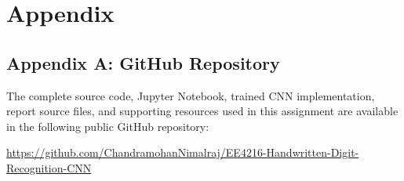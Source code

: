 \section{Appendix}
\subsection{Appendix A: GitHub Repository}

The complete source code, Jupyter Notebook, trained CNN implementation, report source files, and supporting resources used in this assignment are available in the following public GitHub repository:

\url{https://github.com/ChandramohanNimalraj/EE4216-Handwritten-Digit-Recognition-CNN}
